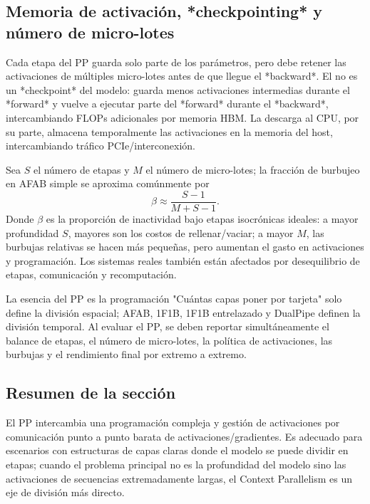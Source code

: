 \subsection{Memoria de activación, *checkpointing* y número de micro-lotes}

Cada etapa del PP guarda solo parte de los parámetros, pero debe retener las activaciones de múltiples micro-lotes antes de que llegue el *backward*. El  no es un *checkpoint* del modelo: guarda menos activaciones intermedias durante el *forward* y vuelve a ejecutar parte del *forward* durante el *backward*, intercambiando FLOPs adicionales por memoria HBM. La descarga al CPU, por su parte, almacena temporalmente las activaciones en la memoria del host, intercambiando tráfico PCIe/interconexión.


Sea $S$ el número de etapas y $M$ el número de micro-lotes; la fracción de burbujeo en AFAB simple se aproxima comúnmente por
\[
\beta\approx\frac{S-1}{M+S-1}.
\]
Donde $\beta$ es la proporción de inactividad bajo etapas isocrónicas ideales: a mayor profundidad $S$, mayores son los costos de rellenar/vaciar; a mayor $M$, las burbujas relativas se hacen más pequeñas, pero aumentan el gasto en activaciones y programación. Los sistemas reales también están afectados por desequilibrio de etapas, comunicación y recomputación.

\begin{importantbox}{La esencia del PP es la programación}
"Cuántas capas poner por tarjeta" solo define la división espacial; AFAB, 1F1B, 1F1B entrelazado y DualPipe definen la división temporal. Al evaluar el PP, se deben reportar simultáneamente el balance de etapas, el número de micro-lotes, la política de activaciones, las burbujas y el rendimiento final por extremo a extremo.
\end{importantbox}

\subsection{Resumen de la sección}

El PP intercambia una programación compleja y gestión de activaciones por comunicación punto a punto barata de activaciones/gradientes. Es adecuado para escenarios con estructuras de capas claras donde el modelo se puede dividir en etapas; cuando el problema principal no es la profundidad del modelo sino las activaciones de secuencias extremadamente largas, el Context Parallelism es un eje de división más directo.


